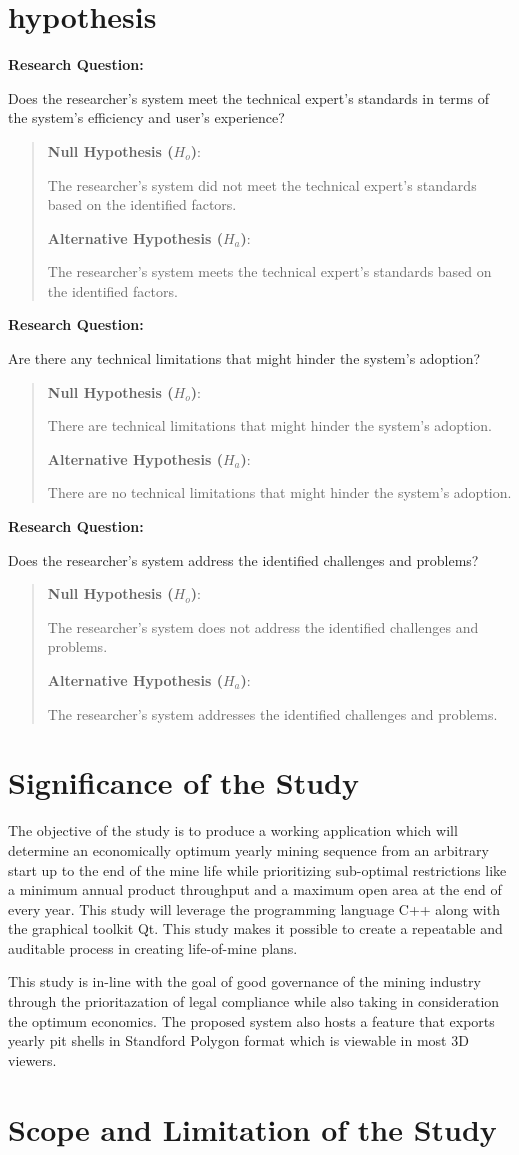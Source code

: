 \documentclass[12pt]{report}
\newcommand{\hypothesis}[3]{
\noindent \textbf{Research Question:}
\par#1
\begin{quotation}
    \noindent \textbf{Null Hypothesis ($H_o$)}:
    \par#2

    \noindent \textbf{Alternative Hypothesis ($H_a$)}:
    \par#3
\end{quotation}
}
\begin{document}
\section{hypothesis}

\hypothesis{
Does the researcher's system meet the technical expert's standards in terms of the system's efficiency and user's experience?
}{
The researcher's system did not meet the technical expert's standards based on the identified factors.
}{
The researcher's system meets the technical expert's standards based on the identified factors.
}

\hypothesis{
Are there any technical limitations that might hinder the system's adoption?
}{
There are technical limitations that might hinder the system's adoption.
}{
There are no technical limitations that might hinder the system's adoption.
}

\hypothesis{
Does the researcher's system address the identified challenges and problems?
}{
The researcher's system does not address the identified challenges and problems.
}{
The researcher's system addresses the identified challenges and problems.
}

\section{Significance of the Study}

The objective of the study is to produce a working application which will determine an economically optimum yearly mining sequence from an arbitrary start up to the end of the mine life while prioritizing sub-optimal restrictions like a minimum annual product throughput and a maximum open area at the end of every year.
This study will leverage the programming language C++\cite{cpp} along with the graphical toolkit Qt\cite{qt}.
This study makes it possible to create a repeatable and auditable process in creating life-of-mine plans.

This study is in-line with the goal of good governance of the mining industry through the prioritazation of legal compliance while also taking in consideration the optimum economics.
The proposed system also hosts a feature that exports yearly pit shells in Standford Polygon format \cite{ply} which is viewable in most 3D viewers.

\section{Scope and Limitation of the Study}
\end{document}
